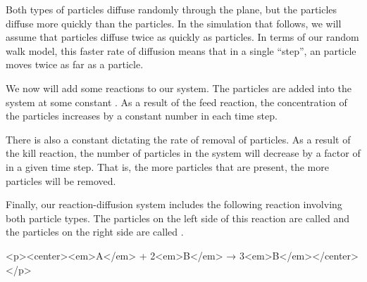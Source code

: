 Both types of particles diffuse randomly through the plane, but the  particles diffuse more quickly than the  particles.  In the simulation that follows, we will assume that  particles diffuse twice as quickly as  particles. In terms of our random walk model, this faster rate of diffusion means that in a single ``step'', an  particle moves twice as far as a  particle.

\begin{qbox}\end{qbox}

We now will add some reactions to our system. The  particles are added into the system at some constant  . As a result of the feed reaction, the concentration of the  particles increases by a constant number in each time step.

\begin{note}\end{note}

There is also a  constant  dictating the rate of removal of  particles. As a result of the kill reaction, the number of  particles in the system will decrease by a factor of  in a given time step. That is, the more  particles that are present, the more  particles will be removed.

Finally, our reaction-diffusion system includes the following reaction involving both particle types. The particles on the left side of this reaction are called  and the particles on the right side are called .

<p><center><em>A</em> + 2<em>B</em> → 3<em>B</em></center></p>

